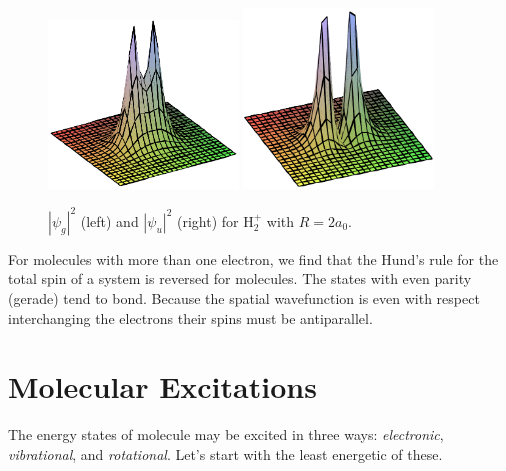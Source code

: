 {
\begin{figure}
\centering
\includegraphics[width=0.45\textwidth]{psig} 
\includegraphics[width=0.45\textwidth]{psiu} 
\caption{$|\psi_g|^2$ (left) and $|\psi_u|^2$ (right) for H$_2^+$ with
  $R=2 a_0$.}
\label{fig:psiug}
\end{figure}
}

For molecules with more than one electron, we find that the Hund's rule
for the total spin of a system is reversed for molecules.  The states
with even parity (gerade) tend to bond.  Because the spatial wavefunction is
even with respect interchanging the electrons their spins must be
antiparallel. 

\section{Molecular Excitations}
\label{sec:molec-excit}

The energy states of molecule may be excited in three ways: {\em
  electronic}, {\em vibrational}, and {\em rotational}.  Let's start
  with the least energetic of these.

